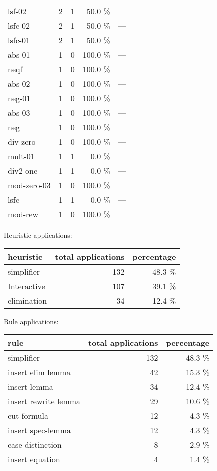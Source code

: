 \documentclass[a4paper]{article}
\begin{document}
\begin{supertabular}{l|r|r|r|r}
lsf-02 & 2 & 1 & 50.0 \% & ---\\
lsfc-02 & 2 & 1 & 50.0 \% & ---\\
lsfc-01 & 2 & 1 & 50.0 \% & ---\\
abs-01 & 1 & 0 & 100.0 \% & ---\\
neqf & 1 & 0 & 100.0 \% & ---\\
abs-02 & 1 & 0 & 100.0 \% & ---\\
neg-01 & 1 & 0 & 100.0 \% & ---\\
abs-03 & 1 & 0 & 100.0 \% & ---\\
neg & 1 & 0 & 100.0 \% & ---\\
div-zero & 1 & 0 & 100.0 \% & ---\\
mult-01 & 1 & 1 & 0.0 \% & ---\\
div2-one & 1 & 1 & 0.0 \% & ---\\
mod-zero-03 & 1 & 0 & 100.0 \% & ---\\
lsfc & 1 & 1 & 0.0 \% & ---\\
mod-rew & 1 & 0 & 100.0 \% & ---\\

\end{supertabular}

Heuristic applications:

\begin{supertabular}{l|r|r}
heuristic	& total applications & percentage \\ \hline
simplifier & 132 & 48.3 \% \\
Interactive & 107 & 39.1 \% \\
elimination & 34 & 12.4 \% \\

\end{supertabular}

Rule applications:

\begin{supertabular}{l|r|r}
rule	        & total applications & percentage \\ \hline
simplifier & 132 & 48.3 \% \\
insert elim lemma & 42 & 15.3 \% \\
insert lemma & 34 & 12.4 \% \\
insert rewrite lemma & 29 & 10.6 \% \\
cut formula & 12 & 4.3 \% \\
insert spec-lemma & 12 & 4.3 \% \\
case distinction & 8 & 2.9 \% \\
insert equation & 4 & 1.4 \% \\

\end{supertabular}
\end{document}
